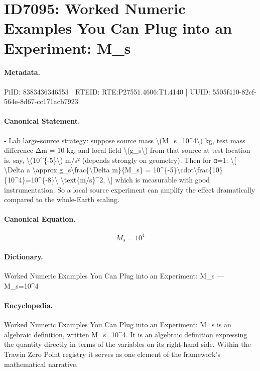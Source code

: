 \section*{ID7095: Worked Numeric Examples You Can Plug into an Experiment: M\_s}
\paragraph{Metadata.}
PiID: 8383436346553 | RTEID: RTE:P27551.4606:T1.4140 | UUID: 5505f410-82cf-564e-8d67-cc171acb7923

\paragraph{Canonical Statement.}
- Lab large-source strategy: suppose source mass \textbackslash{}(M\_s=10\textasciicircum{}4\textbackslash{}) kg, test mass difference Δm = 10 kg, and local field \textbackslash{}(g\_s\textbackslash{}) from that source at test location is, say, \textbackslash{}(10\textasciicircum{}\{-5\}\textbackslash{}) m/s² (depends strongly on geometry). Then for α=1: \textbackslash{}[ \textbackslash{}Delta a \textbackslash{}approx g\_s\textbackslash{}frac\{\textbackslash{}Delta m\}\{M\_s\} = 10\textasciicircum{}\{-5\}\textbackslash{}cdot\textbackslash{}frac\{10\}\{10\textasciicircum{}4\}=10\textasciicircum{}\{-8\}\textbackslash{} \textbackslash{}text\{m/s\}\textasciicircum{}2, \textbackslash{}] which is measurable with good instrumentation. So a local source experiment can amplify the effect dramatically compared to the whole-Earth scaling.

\paragraph{Canonical Equation.}
\[
M_s=10^4
\]

\paragraph{Dictionary.}
Worked Numeric Examples You Can Plug into an Experiment: M\_s — M\_s=10\textasciicircum{}4

\paragraph{Encyclopedia.}
Worked Numeric Examples You Can Plug into an Experiment: M\_s is an algebraic definition, written M\_s=10\textasciicircum{}4. It is an algebraic definition expressing the quantity directly in terms of the variables on its right-hand side. Within the Trawin Zero Point registry it serves as one element of the framework's mathematical narrative.
